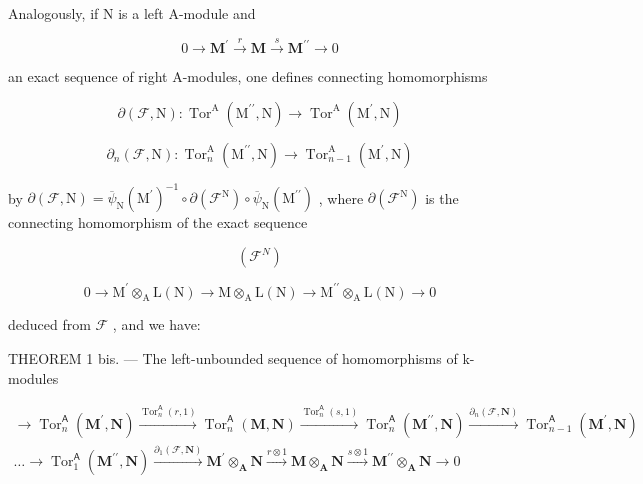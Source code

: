 Analogously, if N is a left A-module and

\[
0 \to \mathbf {M} ^ {\prime} \xrightarrow {r} \mathbf {M} \xrightarrow {s} \mathbf {M} ^ {\prime \prime} \to 0\tag{F}
\]

an exact sequence of right A-modules, one defines connecting homomorphisms

\[
\partial (\mathcal {F}, \mathrm{N}): \operatorname{Tor} ^ {\mathrm{A}} \left(\mathrm{M} ^ {\prime \prime}, \mathrm{N}\right)\rightarrow \operatorname{Tor} ^ {\mathrm{A}} \left(\mathrm{M} ^ {\prime}, \mathrm{N}\right)
\]

\[
\partial_ {n} (\mathcal {F}, \mathrm{N}): \operatorname{Tor} _ {n} ^ {\mathrm{A}} \left(\mathrm{M} ^ {\prime \prime}, \mathrm{N}\right)\rightarrow \operatorname{Tor} _ {n - 1} ^ {\mathrm{A}} \left(\mathrm{M} ^ {\prime}, \mathrm{N}\right)
\]

by \(\partial(\mathcal{F},\mathrm{N})=\overline{\psi}_{\mathrm{N}}(\mathrm{M}^{\prime})^{-1}\circ\partial(\mathcal{F}^{\mathrm{N}})\circ\overline{\psi}_{\mathrm{N}}(\mathrm{M}^{\prime\prime})\) , where \(\partial(\mathcal{F}^{\mathrm{N}})\) is the connecting homomorphism of the exact sequence

\[
(\mathcal {F} ^ {N})
\]

\[
0 \rightarrow \mathrm{M} ^ {\prime} \otimes_ {\mathrm{A}} \mathrm{L} (\mathrm{N}) \rightarrow \mathrm{M} \otimes_ {\mathrm{A}} \mathrm{L} (\mathrm{N}) \rightarrow \mathrm{M} ^ {\prime \prime} \otimes_ {\mathrm{A}} \mathrm{L} (\mathrm{N}) \rightarrow 0
\]

deduced from \(\mathcal{F}\) , and we have:

THEOREM 1 bis. --- The left-unbounded sequence of homomorphisms of k-modules

\[
\begin{array}{l}\rightarrow \operatorname{Tor} _ {n} ^ {\mathsf {A}} (\mathbf {M} ^ {\prime}, \mathbf {N}) \xrightarrow {\operatorname{Tor} _ {n} ^ {\mathsf {A}} (r , 1)} \operatorname{Tor} _ {n} ^ {\mathsf {A}} (\mathbf {M}, \mathbf {N}) \xrightarrow {\operatorname{Tor} _ {n} ^ {\mathsf {A}} (s , 1)} \operatorname{Tor} _ {n} ^ {\mathsf {A}} (\mathbf {M} ^ {\prime \prime}, \mathbf {N}) \xrightarrow {\partial_ {n} (\mathcal {F} , \mathbf {N})} \operatorname{Tor} _ {n - 1} ^ {\mathsf {A}} (\mathbf {M} ^ {\prime}, \mathbf {N})\\\dots \rightarrow \operatorname{Tor} _ {1} ^ {\mathsf {A}} (\mathbf {M} ^ {\prime \prime}, \mathbf {N}) \xrightarrow {\partial_ {1} (\mathcal {F} , \mathbf {N})} \mathbf {M} ^ {\prime} \otimes_ {\mathbf {A}} \mathbf {N} \xrightarrow {r \otimes 1} \mathbf {M} \otimes_ {\mathbf {A}} \mathbf {N} \xrightarrow {s \otimes 1} \mathbf {M} ^ {\prime \prime} \otimes_ {\mathbf {A}} \mathbf {N} \longrightarrow 0\end{array}
\]

